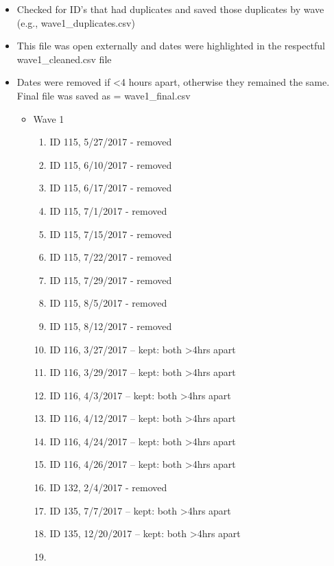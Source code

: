 \documentclass[
]{book}
\providecommand{\tightlist}{%
  \setlength{\itemsep}{0pt}\setlength{\parskip}{0pt}}
\begin{document}
\begin{itemize}
\tightlist
\item
  Checked for ID's that had duplicates and saved those duplicates by wave (e.g., wave1\_duplicates.csv)
\item
  This file was open externally and dates were highlighted in the respectful wave1\_cleaned.csv file
\item
  Dates were removed if \textless4 hours apart, otherwise they remained the same. Final file was saved as = wave1\_final.csv

  \begin{itemize}
  \tightlist
  \item
    Wave 1

    \begin{enumerate}
    \def\labelenumi{\arabic{enumi}.}
    \tightlist
    \item
      ID 115, 5/27/2017 - removed
    \item
      ID 115, 6/10/2017 - removed
    \item
      ID 115, 6/17/2017 - removed
    \item
      ID 115, 7/1/2017 - removed
    \item
      ID 115, 7/15/2017 - removed
    \item
      ID 115, 7/22/2017 - removed
    \item
      ID 115, 7/29/2017 - removed
    \item
      ID 115, 8/5/2017 - removed
    \item
      ID 115, 8/12/2017 - removed
    \item
      ID 116, 3/27/2017 -- kept: both \textgreater4hrs apart
    \item
      ID 116, 3/29/2017 -- kept: both \textgreater4hrs apart
    \item
      ID 116, 4/3/2017 -- kept: both \textgreater4hrs apart
    \item
      ID 116, 4/12/2017 -- kept: both \textgreater4hrs apart
    \item
      ID 116, 4/24/2017 -- kept: both \textgreater4hrs apart
    \item
      ID 116, 4/26/2017 -- kept: both \textgreater4hrs apart
    \item
      ID 132, 2/4/2017 - removed
    \item
      ID 135, 7/7/2017 -- kept: both \textgreater4hrs apart
    \item
      ID 135, 12/20/2017 -- kept: both \textgreater4hrs apart
    \item

\end{enumerate}
\end{itemize}
\end{itemize}
\end{document}
